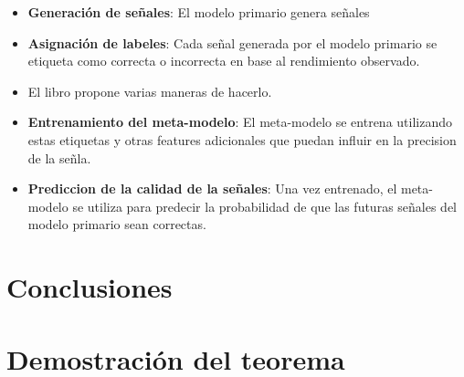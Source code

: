 \documentclass[a4paper,12pt]{report}
\begin{document}
\begin{itemize}
   \item \textbf{Generación de señales}: El modelo primario genera señales
   \item \textbf{Asignación de labeles}: Cada señal generada por el modelo primario se etiqueta como correcta o incorrecta en base al rendimiento observado.
   \item El libro propone varias maneras de hacerlo.
   \item \textbf{Entrenamiento del meta-modelo}: El meta-modelo se entrena utilizando estas etiquetas y otras features adicionales que puedan influir en la precision de la señla.
   \item \textbf{Prediccion de la calidad de la señales}: Una vez entrenado, el meta-modelo se utiliza para predecir la probabilidad de que las 
   futuras señales del modelo primario sean correctas.
\end{itemize}

\chapter{Conclusiones}

\appendix

\chapter{Demostración del teorema}



\end{document}
